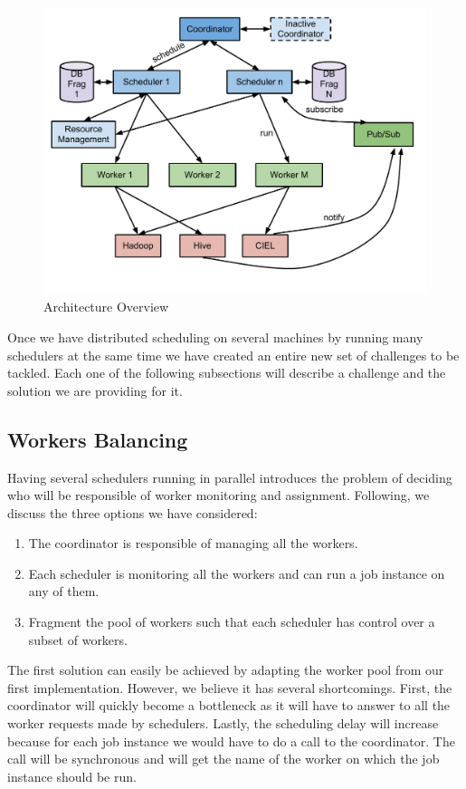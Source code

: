 \documentclass[11pt,a4paper,twoside]{report}
\begin{document}
\begin{figure}[h]
\centering
\includegraphics[scale=0.75]{DronDesign2}
\caption{Architecture Overview}
\label{fig:DronDesign2}
\end{figure}

Once we have distributed scheduling on several machines by running many schedulers at the same time we have created an entire new set of challenges to be tackled. Each one of the following subsections will describe a challenge and the solution we are providing for it.

\subsection{Workers Balancing}
\label{subsec:WorkersBalancing}
Having several schedulers running in parallel introduces the problem of deciding who will be responsible of worker monitoring and assignment. Following, we discuss the three options we have considered:

\begin{enumerate}
\item{}
The coordinator is responsible of managing all the workers.
\item{}
Each scheduler is monitoring all the workers and can run a job instance on any
of them.
\item{}
Fragment the pool of workers such that each scheduler has control over a subset
of workers.
\end{enumerate}


The first solution can easily be achieved by adapting the worker pool from our first implementation. However, we believe it has several shortcomings. First, the coordinator will quickly become a bottleneck as it will have to answer to all the worker requests made by schedulers. Lastly, the scheduling delay will increase because for each job instance we would have to do a call to the coordinator. The call will be synchronous and will get the name of the worker on which the job instance should be run.
\end{document}
